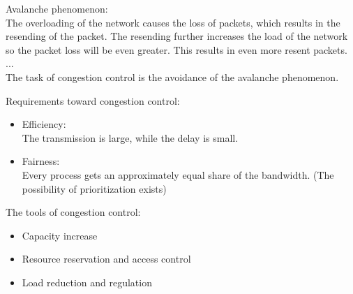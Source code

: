 \documentclass[margin=0px]{article}
\begin{document}
\begin{description}
        Avalanche phenomenon: \\
        The overloading of the network causes the loss of packets, which results in the resending of the packet. The resending further increases the load of the network so the packet loss will be even greater. This results in even more resent packets. ... \\
        The task of congestion control is the avoidance of the avalanche phenomenon.

        Requirements toward congestion control:
        \begin{itemize}
            \item Efficiency: \\
                  The transmission is large, while the delay is small.
            \item Fairness: \\
                  Every process gets an approximately equal share of the bandwidth. (The possibility of prioritization exists)
        \end{itemize}

        The tools of congestion control:
        \begin{itemize}
            \item Capacity increase
            \item Resource reservation and access control
            \item Load reduction and regulation
        \end{itemize}


\end{description}
\end{document}
